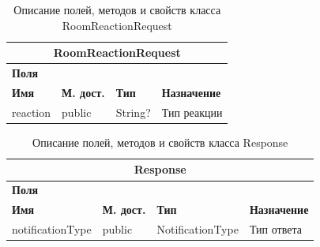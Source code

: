 \documentclass{../includes/TechDoc}
\begin{document}
    \begin{table}[h]
        \caption{\label{tab:class-WebsocketEventListener-table}Описание полей, методов и свойств класса RoomReactionRequest}
        \begin{tabularx}{\textwidth}{|l|l|l|X|}
            \hline
            \multicolumn{4}{|c|}{RoomReactionRequest} \\ \hline
            \multicolumn{4}{|l|}{\textbf{Поля}} \\ \hline
            \textbf{Имя} & \textbf{М. дост.} & \textbf{Тип} & \textbf{Назначение} \\ \hline
            reaction     & public            & String?      & Тип реакции         \\ \hline
        \end{tabularx}
    \end{table}

    \begin{table}[h]
        \caption{\label{tab:class-WebsocketEventListener-table}Описание полей, методов и свойств класса Response}
        \begin{tabularx}{\textwidth}{|l|l|l|X|}
            \hline
            \multicolumn{4}{|c|}{Response} \\ \hline
            \multicolumn{4}{|l|}{\textbf{Поля}} \\ \hline
            \textbf{Имя}     & \textbf{М. дост.} & \textbf{Тип}     & \textbf{Назначение} \\ \hline
            notificationType & public            & NotificationType & Тип ответа          \\ \hline
        \end{tabularx}
    \end{table}
\end{document}
